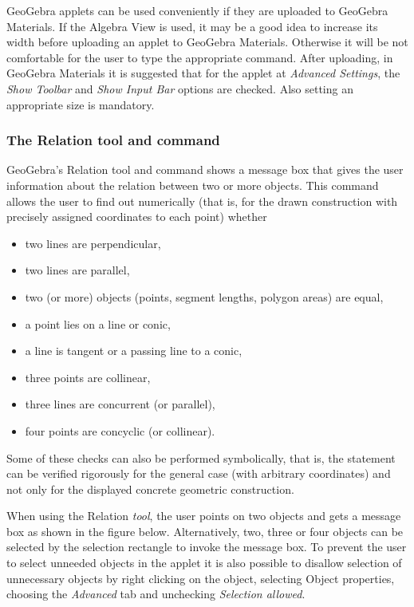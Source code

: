 \documentclass{article}
\begin{document}
GeoGebra applets can be used conveniently if they are uploaded to GeoGebra Materials.
If the Algebra View is used, it may be a good idea to increase its width before uploading an applet to GeoGebra Materials. Otherwise it will be not comfortable for the user to type the appropriate command. After uploading, in GeoGebra Materials it is suggested that for the applet at \textit{Advanced Settings}, the \textit{Show Toolbar} and \textit{Show Input Bar} options are checked. Also setting an appropriate size is mandatory.


\subsubsection{The Relation tool and command}

GeoGebra's Relation tool and command shows a message box that gives the user information about the relation between two or more objects.
This command allows the user to find out numerically (that is, for the drawn construction with precisely assigned coordinates to each point) whether
\begin{itemize}
    \item two lines are perpendicular,
    \item two lines are parallel,
    \item two (or more) objects (points, segment lengths, polygon areas) are equal,
    \item a point lies on a line or conic,
    \item a line is tangent or a passing line to a conic,
    \item three points are collinear,
    \item three lines are concurrent (or parallel),
    \item four points are concyclic (or collinear).
\end{itemize}
Some of these checks can also be performed symbolically, that is, the statement can be verified rigorously for the general case (with arbitrary coordinates) and not only for the displayed concrete geometric construction.

When using the Relation \textit{tool}, the user points on two objects and gets a message box as shown in the figure below. Alternatively, two, three or four objects can be selected by the selection rectangle to invoke the message box. To prevent the user to select unneeded objects in the applet it is also possible to disallow selection of unnecessary objects by
right clicking on the object, selecting Object properties, choosing the \textit{Advanced} tab and unchecking \textit{Selection allowed}.
\end{document}
